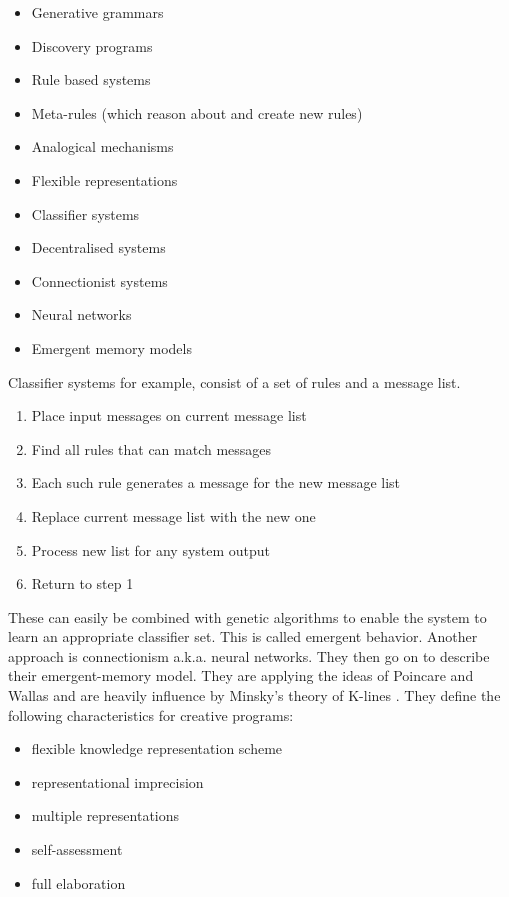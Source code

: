 \begin{itemize}
  \item Generative  grammars
  \item Discovery programs
  \item Rule based systems
  \item Meta-rules (which reason about and create new rules)
  \item Analogical mechanisms
  \item Flexible representations
  \item Classifier systems
  \item Decentralised systems
  \item Connectionist systems
  \item Neural networks
  \item Emergent memory models
\end{itemize}

Classifier systems for example, consist of a set of rules and a message list.

\begin{enumerate}
  \item Place input messages on current message list
  \item Find all rules that can match messages
  \item Each such rule generates a message for the new message list
  \item Replace current message list with the new one
  \item Process new list for any system output
  \item Return to step 1
\end{enumerate}

These can easily be combined with genetic algorithms to enable the system to learn an appropriate classifier set. This is called emergent behavior. Another approach is connectionism a.k.a. neural networks. They then go on to describe their emergent-memory model. They are applying the ideas of Poincare and Wallas and are heavily influence by Minsky's theory of K-lines \citep{Minsky1980, Minsky1988}. They define the following characteristics for creative programs:

\begin{itemize}
  \item flexible knowledge representation scheme
  \item representational imprecision
  \item multiple representations
  \item self-assessment
  \item full elaboration
\end{itemize}

